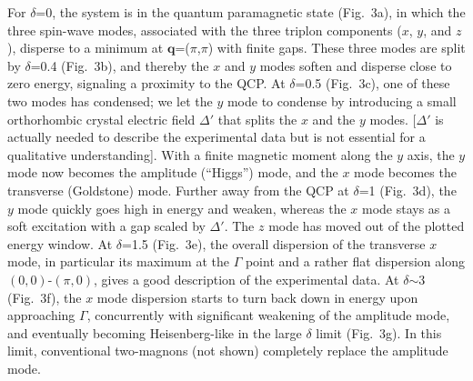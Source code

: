 For $\delta$=0, the system is in the quantum paramagnetic state (Fig.~3a), in which the three spin-wave modes, associated with the three triplon components ($x$, $y$, and $z$), disperse to a minimum at $\mathbf{q}$=($\pi$,$\pi$) with finite gaps. These three modes are split by $\delta$=0.4 (Fig.~3b), and thereby the $x$ and $y$ modes soften and disperse close to zero energy, signaling a proximity to the QCP. At $\delta$=0.5 (Fig.~3c), one of these two modes has condensed; we let the $y$ mode to condense by introducing a small orthorhombic crystal electric field $\Delta'$ that splits the $x$ and the $y$ modes. [$\Delta'$ is actually needed to describe the experimental data but is not essential for a qualitative understanding]. With a finite magnetic moment along the $y$ axis, the $y$ mode now becomes the amplitude (``Higgs'') mode, and the $x$ mode becomes the transverse (Goldstone) mode. Further away from the QCP at $\delta$=1 (Fig.~3d), the $y$ mode quickly goes high in energy and weaken, whereas the $x$ mode stays as a soft excitation with a gap scaled by $\Delta'$. The $z$ mode has moved out of the plotted energy window. At $\delta$=1.5 (Fig.~3e), the overall dispersion of the transverse $x$ mode, in particular its maximum at the $\Gamma$ point and a rather flat dispersion along $(0,0)$-$(\pi,0)$, gives a good description of the experimental data. At $\delta$$\sim$3 (Fig.~3f), the $x$ mode dispersion starts to turn back down in energy upon approaching $\Gamma$, concurrently with significant weakening of the amplitude mode, and eventually becoming Heisenberg-like in the large $\delta$ limit (Fig.~3g). In this limit, conventional two-magnons (not shown) completely replace the amplitude mode.